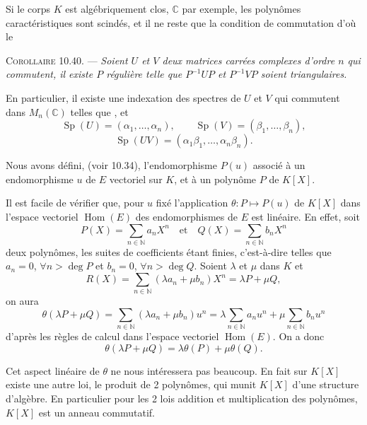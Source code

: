 
Si le corps $K$ est algébriquement clos, $\mathbb C$ par exemple, les polynômes caractéristiques sont scindés, et il ne reste que la condition de commutation d'où le

\medskip\noindent\textsc{Corollaire 10.40.} --- \emph{Soient $U$ et $V$ deux matrices carrées complexes d'ordre $n$ qui commutent, il existe $P$ régulière telle que $P^{-1}UP$ et $P^{-1}VP$ soient triangulaires.}

En particulier, il existe une indexation des spectres de $U$ et $V$ qui commutent dans $M_n(\mathbb C)$ telles que
,
 et
\[
\operatorname{Sp}(U)=(\alpha_1,\ldots,\alpha_n),
\qquad
\operatorname{Sp}(V)=(\beta_1,\ldots,\beta_n),
\]
\[
\operatorname{Sp}(UV)=(\alpha_1\beta_1,\ldots,\alpha_n\beta_n).
\]


Nous avons défini, (voir 10.34), l'endomorphisme $P(u)$ associé à un endomorphisme $u$ de $E$ vectoriel sur $K$, et à un polynôme $P$ de $K[X]$.

Il est facile de vérifier que, pour $u$ fixé l'application $\theta:P\longmapsto P(u)$ de $K[X]$ dans l'espace vectoriel $\operatorname{Hom}(E)$ des endomorphismes de $E$ est linéaire. En effet, soit
\[
P(X)=\sum_{n\in\mathbb N}a_nX^n
\quad\text{et}\quad
Q(X)=\sum_{n\in\mathbb N}b_nX^n
\]
deux polynômes, les suites de coefficients étant finies, c'est-à-dire telles que $a_n=0$, $\forall n>\deg P$ et $b_n=0$, $\forall n>\deg Q$. Soient $\lambda$ et $\mu$ dans $K$ et
\[
R(X)=\sum_{n\in\mathbb N}(\lambda a_n+\mu b_n)X^n=\lambda P+\mu Q,
\]
on aura
\[
\theta(\lambda P+\mu Q)
=\sum_{n\in\mathbb N}(\lambda a_n+\mu b_n)u^n
=\lambda\sum_{n\in\mathbb N}a_nu^n
+\mu\sum_{n\in\mathbb N}b_nu^n
\]
d'après les règles de calcul dans l'espace vectoriel $\operatorname{Hom}(E)$. On a donc
\[
\theta(\lambda P+\mu Q)=\lambda\theta(P)+\mu\theta(Q).
\]

Cet aspect linéaire de $\theta$ ne nous intéressera pas beaucoup. En fait sur $K[X]$ existe une autre loi, le produit de 2 polynômes, qui munit $K[X]$ d'une structure d'algèbre. En particulier pour les 2 lois addition et multiplication des polynômes, $K[X]$ est un anneau commutatif.

